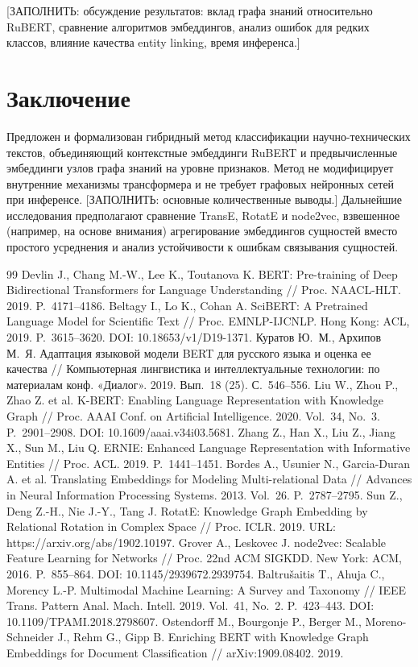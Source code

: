 \documentclass{misisarticle}
\begin{document}
[ЗАПОЛНИТЬ: обсуждение результатов: вклад графа знаний относительно RuBERT, сравнение алгоритмов эмбеддингов, анализ ошибок для редких классов, влияние качества entity linking, время инференса.]

\section{Заключение}
Предложен и формализован гибридный метод классификации научно-технических текстов, объединяющий контекстные эмбеддинги RuBERT и предвычисленные эмбеддинги узлов графа знаний на уровне признаков. Метод не модифицирует внутренние механизмы трансформера и не требует графовых нейронных сетей при инференсе. [ЗАПОЛНИТЬ: основные количественные выводы.] Дальнейшие исследования предполагают сравнение TransE, RotatE и node2vec, взвешенное (например, на основе внимания) агрегирование эмбеддингов сущностей вместо простого усреднения и анализ устойчивости к ошибкам связывания сущностей.

\begin{thebibliography}{99}
 Devlin J., Chang M.-W., Lee K., Toutanova K. BERT: Pre-training of Deep Bidirectional Transformers for Language Understanding // Proc. NAACL-HLT. 2019. P.~4171--4186.
 Beltagy I., Lo K., Cohan A. SciBERT: A Pretrained Language Model for Scientific Text // Proc. EMNLP-IJCNLP. Hong Kong: ACL, 2019. P.~3615--3620. DOI: 10.18653/v1/D19-1371.
 Куратов Ю.~М., Архипов М.~Я. Адаптация языковой модели BERT для русского языка и оценка ее качества // Компьютерная лингвистика и интеллектуальные технологии: по материалам конф. «Диалог». 2019. Вып.~18 (25). С.~546--556.
 Liu W., Zhou P., Zhao Z. et al. K-BERT: Enabling Language Representation with Knowledge Graph // Proc. AAAI Conf. on Artificial Intelligence. 2020. Vol.~34, No.~3. P.~2901--2908. DOI: 10.1609/aaai.v34i03.5681.
 Zhang Z., Han X., Liu Z., Jiang X., Sun M., Liu Q. ERNIE: Enhanced Language Representation with Informative Entities // Proc. ACL. 2019. P.~1441--1451.
 Bordes A., Usunier N., Garcia-Duran A. et al. Translating Embeddings for Modeling Multi-relational Data // Advances in Neural Information Processing Systems. 2013. Vol.~26. P.~2787--2795.
 Sun Z., Deng Z.-H., Nie J.-Y., Tang J. RotatE: Knowledge Graph Embedding by Relational Rotation in Complex Space // Proc. ICLR. 2019. URL: https://arxiv.org/abs/1902.10197.
 Grover A., Leskovec J. node2vec: Scalable Feature Learning for Networks // Proc. 22nd ACM SIGKDD. New York: ACM, 2016. P.~855--864. DOI: 10.1145/2939672.2939754.
 Baltrušaitis T., Ahuja C., Morency L.-P. Multimodal Machine Learning: A Survey and Taxonomy // IEEE Trans. Pattern Anal. Mach. Intell. 2019. Vol.~41, No.~2. P.~423--443. DOI: 10.1109/TPAMI.2018.2798607.
 Ostendorff M., Bourgonje P., Berger M., Moreno-Schneider J., Rehm G., Gipp B. Enriching BERT with Knowledge Graph Embeddings for Document Classification // arXiv:1909.08402. 2019.
\end{thebibliography}
\end{document}
